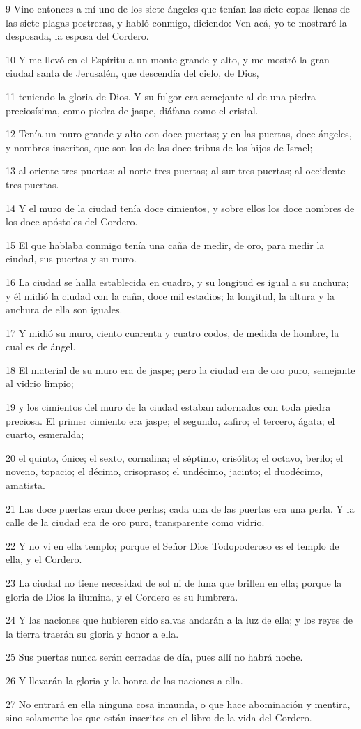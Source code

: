 \par 9 Vino entonces a mí uno de los siete ángeles que tenían las siete copas llenas de las siete plagas postreras, y habló conmigo, diciendo: Ven acá, yo te mostraré la desposada, la esposa del Cordero.
\par 10 Y me llevó en el Espíritu a un monte grande y alto, y me mostró la gran ciudad santa de Jerusalén, que descendía del cielo, de Dios,
\par 11 teniendo la gloria de Dios. Y su fulgor era semejante al de una piedra preciosísima, como piedra de jaspe, diáfana como el cristal.
\par 12 Tenía un muro grande y alto con doce puertas; y en las puertas, doce ángeles, y nombres inscritos, que son los de las doce tribus de los hijos de Israel;
\par 13 al oriente tres puertas; al norte tres puertas; al sur tres puertas; al occidente tres puertas.
\par 14 Y el muro de la ciudad tenía doce cimientos, y sobre ellos los doce nombres de los doce apóstoles del Cordero.
\par 15 El que hablaba conmigo tenía una caña de medir, de oro, para medir la ciudad, sus puertas y su muro.
\par 16 La ciudad se halla establecida en cuadro, y su longitud es igual a su anchura; y él midió la ciudad con la caña, doce mil estadios; la longitud, la altura y la anchura de ella son iguales.
\par 17 Y midió su muro, ciento cuarenta y cuatro codos, de medida de hombre, la cual es de ángel.
\par 18 El material de su muro era de jaspe; pero la ciudad era de oro puro, semejante al vidrio limpio;
\par 19 y los cimientos del muro de la ciudad estaban adornados con toda piedra preciosa. El primer cimiento era jaspe; el segundo, zafiro; el tercero, ágata; el cuarto, esmeralda;
\par 20 el quinto, ónice; el sexto, cornalina; el séptimo, crisólito; el octavo, berilo; el noveno, topacio; el décimo, crisopraso; el undécimo, jacinto; el duodécimo, amatista.
\par 21 Las doce puertas eran doce perlas; cada una de las puertas era una perla. Y la calle de la ciudad era de oro puro, transparente como vidrio.
\par 22 Y no vi en ella templo; porque el Señor Dios Todopoderoso es el templo de ella, y el Cordero.
\par 23 La ciudad no tiene necesidad de sol ni de luna que brillen en ella; porque la gloria de Dios la ilumina, y el Cordero es su lumbrera.
\par 24 Y las naciones que hubieren sido salvas andarán a la luz de ella; y los reyes de la tierra traerán su gloria y honor a ella.
\par 25 Sus puertas nunca serán cerradas de día, pues allí no habrá noche.
\par 26 Y llevarán la gloria y la honra de las naciones a ella.
\par 27 No entrará en ella ninguna cosa inmunda, o que hace abominación y mentira, sino solamente los que están inscritos en el libro de la vida del Cordero.

